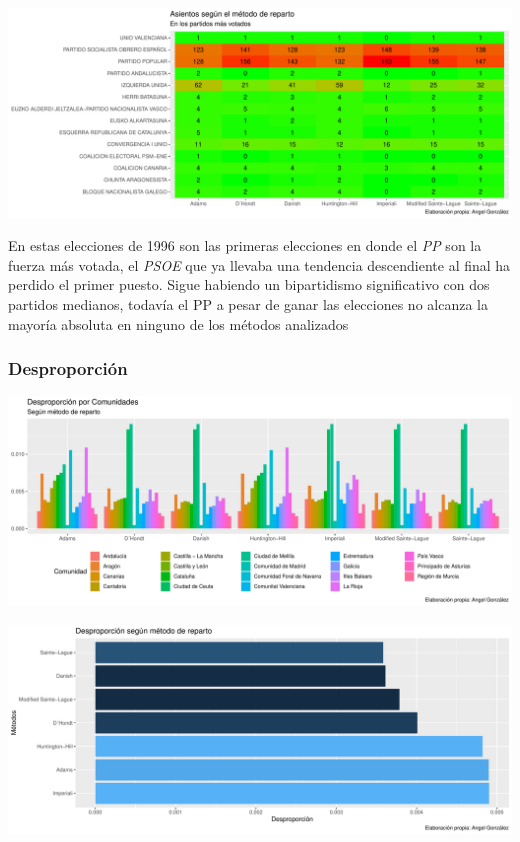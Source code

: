 \documentclass[12pt,a4paper,]{book}
\numberwithin{dummy}{section}
\theoremstyle{ocrenumbox}
\theoremstyle{blacknumex}
\theoremstyle{blacknumbox}
\theoremstyle{ocrenum}
\theoremstyle{ocrenum}
\begin{document}
\begin{center}\includegraphics[width=0.95\linewidth]{figurasR/unnamed-chunk-116-2} \end{center}

En estas elecciones de 1996 son las primeras elecciones en donde el
\emph{PP} son la fuerza más votada, el \emph{PSOE} que ya llevaba una
tendencia descendiente al final ha perdido el primer puesto. Sigue
habiendo un bipartidismo significativo con dos partidos medianos,
todavía el PP a pesar de ganar las elecciones no alcanza la mayoría
absoluta en ninguno de los métodos analizados

\hypertarget{desproporciuxf3n-6}{%
\subsubsection{Desproporción}\label{desproporciuxf3n-6}}

\begin{center}\includegraphics[width=0.95\linewidth]{figurasR/unnamed-chunk-117-1} \end{center}

\begin{center}\includegraphics[width=0.95\linewidth]{figurasR/unnamed-chunk-117-2} \end{center}
\end{document}
